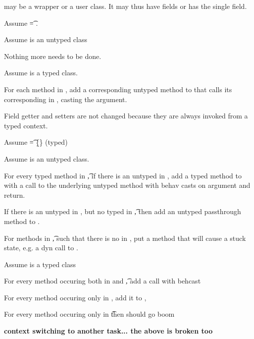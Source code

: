 \documentclass[a4paper,UKenglish,final]{lipics}
\begin{document}
\C may be a wrapper or a user class. It may thus have fields or has the
single \that field.


Assume \t = \any. 

Assume \C is an untyped class

Nothing more needs to be done.

Assume \C is a typed class.

For each method \m in \C, add a corresponding untyped method \m to \D that calls its corresponding \m in \C, casting the argument.

Field getter and setters are not changed because they are always invoked from a typed context.

Assume \t = \{\b{\mt}\} (typed) 

Assume \C is an untyped class.

For every typed method \m in \t,  if there is an untyped \m in \C, add a typed method \m to \D with a call to the underlying untyped method with behav casts on argument and return.

If there is an untyped \m in \C, but no typed \m in \t, then add an untyped passthrough method to \D.

For methods \m in \t, such that there is no \m in \C, put a method that will cause a stuck state, e.g. a dyn call to \m.

Assume \C is a typed class

For every method \m occuring both in \C and \t, add a call with behcast

For every method \m occuring only in \C, add it to \D, 

For every method \m occuring only in \t then should go boom


{\bf context switching to another task... the above is broken too}



\hrulefill


\begin{mathpar}



\end{mathpar}
\end{document}
